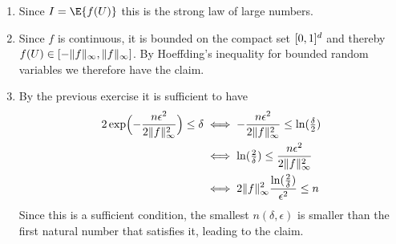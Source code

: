 \documentclass[11pt]{article}
\begin{document}
\begin{solution}
\begin{enumerate}[wide=0pt]
    \item[\ref{it: (monte carlo) convergence}]
    Since \(I= \E{f(U)}\) this is the strong law of large numbers.

    \item[\ref{it: (monte carlo) PAC bound}]
    Since \(f\) is continuous, it is bounded on the compact set \([0,1]^d\)
    and thereby \(f(U) \in [-\lVert f\rVert_\infty, \lVert f\rVert_\infty]\).
    By Hoeffding's inequality 
    for bounded random variables we therefore have the claim.

    \item[\ref{it: (monte carlo) sample complexity}]
    By the previous exercise it is sufficient to have
    \begin{align*}
        2\exp\Bigl(-\frac{n\epsilon^2}{2\lVert f\rVert_\infty^2}\Bigr) \le \delta
        &\iff -\frac{n\epsilon^2}{2\lVert f\rVert_\infty^2} \le \ln(\tfrac{\delta}2)
        \\
        &\iff \ln(\tfrac{2}\delta) \le \frac{n \epsilon^2}{2\lVert f\rVert_\infty^2}
        \\
        &\iff 2\lVert f\rVert_\infty^2 \frac{\ln(\tfrac2\delta)}{\epsilon^2} \le n
    \end{align*}
    Since this is a sufficient condition, the smallest \(n(\delta, \epsilon)\)
    is smaller than the first natural number that satisfies it, leading
    to the claim.
    \qedhere
\end{enumerate}
\end{solution}
\end{document}
